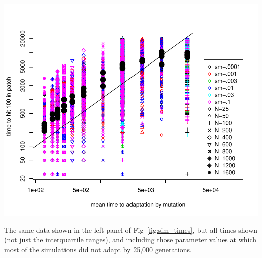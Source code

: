\documentclass{article}
\begin{document}






\begin{sfigure}
  \begin{center}
    \includegraphics{mutation-times-predicted}
  \end{center}
  \caption{
    The same data shown in the left panel of Fig~\ref{fig:sim_times},
    but all times shown (not just the interquartile ranges),
    and including those parameter values at which most of the simulations did not adapt by 25,000 generations.
  } \label{sfig:sim_migration_times}
\end{sfigure}
\end{document}

